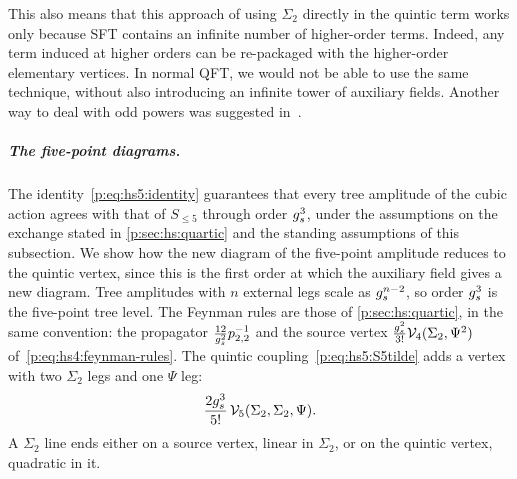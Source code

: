 This also means that this approach of using $\Sigma_2$ directly in the quintic term works only because SFT contains an infinite number of higher-order terms.
Indeed, any term induced at higher orders can be re-packaged with the higher-order elementary vertices.
In normal QFT, we would not be able to use the same technique, without also introducing an infinite tower of auxiliary fields.
Another way to deal with odd powers was suggested in~\cite{Rivasseau:2010:LoopVertexExpansion,Lionni:2019:IntermediateFieldRepresentation}.


\subparagraph{The five-point diagrams.}

The identity~\eqref{p:eq:hs5:identity} guarantees that every tree amplitude of the cubic action agrees with that of $S_{\le 5}$ through order $g_s^3$, under the assumptions on the exchange stated in \cref{p:sec:hs:quartic} and the standing assumptions of this subsection.
We show how the new diagram of the five-point amplitude reduces to the quintic vertex, since this is the first order at which the auxiliary field gives a new diagram.
Tree amplitudes with $n$ external legs scale as $g_s^{n - 2}$, so order $g_s^3$ is the five-point tree level.
The Feynman rules are those of \cref{p:sec:hs:quartic}, in the same convention: the propagator $\tfrac{12}{g_s^2} p_{2,2}^{-1}$ and the source vertex $\tfrac{g_s^2}{3!} \mathcal{V}_{4}(\Sigma_2, \Psi^2)$ of~\eqref{p:eq:hs4:feynman-rules}.
The quintic coupling~\eqref{p:eq:hs5:S5tilde} adds a vertex with two $\Sigma_2$ legs and one $\Psi$ leg:
\begin{equation}
  \label{p:eq:hs5:feynman-rule}
  \frac{2 g_s^3}{5!} \, \mathcal{V}_{5}(\Sigma_2, \Sigma_2, \Psi).
\end{equation}
A $\Sigma_2$ line ends either on a source vertex, linear in $\Sigma_2$, or on the quintic vertex, quadratic in it.
